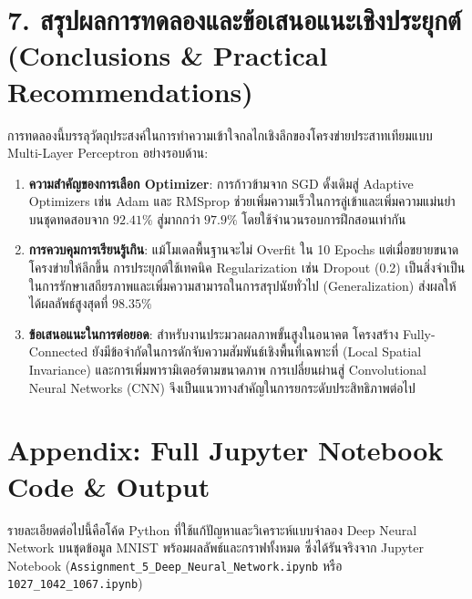 \documentclass[12pt,a4paper]{article}
\begin{document}
\section*{7. สรุปผลการทดลองและข้อเสนอแนะเชิงประยุกต์\\ \large(Conclusions \& Practical Recommendations)}

การทดลองนี้บรรลุวัตถุประสงค์ในการทำความเข้าใจกลไกเชิงลึกของโครงข่ายประสาทเทียมแบบ Multi-Layer Perceptron อย่างรอบด้าน:
\begin{enumerate}[leftmargin=18pt, itemsep=3pt]
    \item \textbf{ความสำคัญของการเลือก Optimizer}: การก้าวข้ามจาก SGD ดั้งเดิมสู่ Adaptive Optimizers เช่น Adam และ RMSprop ช่วยเพิ่มความเร็วในการลู่เข้าและเพิ่มความแม่นยำบนชุดทดสอบจาก $92.41\%$ สู่มากกว่า $97.9\%$ โดยใช้จำนวนรอบการฝึกสอนเท่ากัน
    \item \textbf{การควบคุมการเรียนรู้เกิน}: แม้โมเดลพื้นฐานจะไม่ Overfit ใน 10 Epochs แต่เมื่อขยายขนาดโครงข่ายให้ลึกขึ้น การประยุกต์ใช้เทคนิค Regularization เช่น Dropout (0.2) เป็นสิ่งจำเป็นในการรักษาเสถียรภาพและเพิ่มความสามารถในการสรุปนัยทั่วไป (Generalization) ส่งผลให้ได้ผลลัพธ์สูงสุดที่ $98.35\%$
    \item \textbf{ข้อเสนอแนะในการต่อยอด}: สำหรับงานประมวลผลภาพขั้นสูงในอนาคต โครงสร้าง Fully-Connected ยังมีข้อจำกัดในการดักจับความสัมพันธ์เชิงพื้นที่เฉพาะที่ (Local Spatial Invariance) และการเพิ่มพารามิเตอร์ตามขนาดภาพ การเปลี่ยนผ่านสู่ Convolutional Neural Networks (CNN) จึงเป็นแนวทางสำคัญในการยกระดับประสิทธิภาพต่อไป
\end{enumerate}

\clearpage
\appendix
\raggedbottom
\section*{Appendix: Full Jupyter Notebook Code \& Output}

รายละเอียดต่อไปนี้คือโค้ด Python ที่ใช้แก้ปัญหาและวิเคราะห์แบบจำลอง Deep Neural Network บนชุดข้อมูล MNIST พร้อมผลลัพธ์และกราฟทั้งหมด ซึ่งได้รันจริงจาก Jupyter Notebook (\texttt{Assignment\_5\_Deep\_Neural\_Network.ipynb} หรือ \texttt{1027\_1042\_1067.ipynb})


\end{document}
